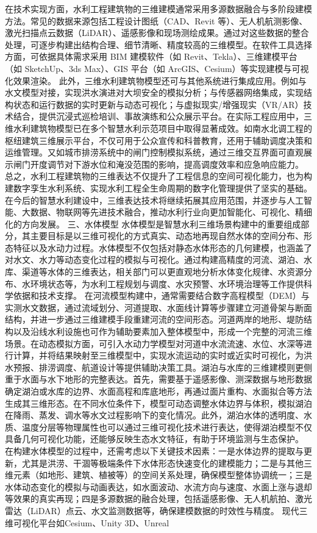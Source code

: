 在技术实现方面，水利工程建筑物的三维建模通常采用多源数据融合与多阶段建模方法。常见的数据来源包括工程设计图纸（CAD、Revit 等）、无人机航测影像、激光扫描点云数据（LiDAR）、遥感影像和现场测绘成果。通过对这些数据的整合处理，可逐步构建出结构合理、细节清晰、精度较高的三维模型。在软件工具选择方面，可依据具体需求采用 BIM 建模软件（如 Revit、Tekla）、三维建模平台（如 SketchUp、3ds Max）、GIS 平台（如 ArcGIS、Cesium）等实现建模与可视化效果渲染。 此外，三维水利建筑物模型还可与其他系统进行集成应用。例如与水文模型对接，实现洪水演进对大坝安全的模拟分析；与传感器网络集成，实现结构状态和运行数据的实时更新与动态可视化；与虚拟现实/增强现实（VR/AR）技术结合，提供沉浸式巡检培训、事故演练和公众展示平台。在实际工程应用中，三维水利建筑物模型已在多个智慧水利示范项目中取得显著成效。如南水北调工程的枢纽建筑三维展示平台，不仅可用于公众宣传和科普教育，还用于辅助调度决策和运维管理。又如城市排涝系统中的闸门控制模拟系统，通过三维交互界面可直观展示闸门开度调节对下游水位和淹没范围的影响，提高调度效率和应急响应能力。 总之，水利工程建筑物的三维表达不仅提升了工程信息的空间可视化能力，也为构建数字孪生水利系统、实现水利工程全生命周期的数字化管理提供了坚实的基础。在今后的智慧水利建设中，三维表达技术将继续拓展其应用范围，并逐步与人工智能、大数据、物联网等先进技术融合，推动水利行业向更加智能化、可视化、精细化的方向发展。 三、水体模型 水体模型是智慧水利三维场景构建中的重要组成部分，其主要目标是以三维可视化的方式真实、动态地再现自然水体的空间分布、形态特征以及水动力过程。水体模型不仅包括对静态水体形态的几何建模，也涵盖了对水文、水力等动态变化过程的模拟与可视化。通过构建高精度的河流、湖泊、水库、渠道等水体的三维表达，相关部门可以更直观地分析水体变化规律、水资源分布、水环境状态等，为水利工程规划与调度、水灾预警、水环境治理等工作提供科学依据和技术支撑。 在河流模型构建中，通常需要结合数字高程模型（DEM）与实测水文数据，通过流域划分、河道提取、水面线计算等步骤建立河道骨架与断面结构，并进一步通过三维建模手段重建河流的空间形态。河道两岸的地形、堤防结构以及沿线水利设施也可作为辅助要素加入整体模型中，形成一个完整的河流三维场景。在动态模拟方面，可引入水动力学模型对河道中水流流速、水位、水深等进行计算，并将结果映射至三维模型中，实现水流运动的实时或近实时可视化，为洪水预报、排涝调度、航道设计等提供辅助决策工具。湖泊与水库的三维建模则更侧重于水面与水下地形的完整表达。首先，需要基于遥感影像、测深数据与地形数据确定湖泊或水库的边界、水面高程和库底地形，再通过面片重构、水面拟合等方法生成其三维形态。在不同水位条件下，模型可动态调整水体边界与体积，模拟湖泊在降雨、蒸发、调水等水文过程影响下的变化情况。此外，湖泊水体的透明度、水质、温度分层等物理属性也可以通过三维可视化技术进行表达，使得湖泊模型不仅具备几何可视化功能，还能够反映生态水文特征，有助于环境监测与生态保护。 在构建水体模型的过程中，还需考虑以下关键技术因素：一是水体边界的提取与更新，尤其是洪涝、干涸等极端条件下水体形态快速变化的建模能力；二是与其他三维元素（如地形、建筑、植被等）的空间关系处理，确保模型整体协调统一；三是水体动态变化的模拟与动画表达，如水面波动、水流方向与速度、水面上涨与退却等效果的真实再现；四是多源数据的融合处理，包括遥感影像、无人机航拍、激光雷达（LiDAR）点云、水文监测数据等，确保建模数据的时效性与精度。 现代三维可视化平台如Cesium、Unity 3D、Unreal 